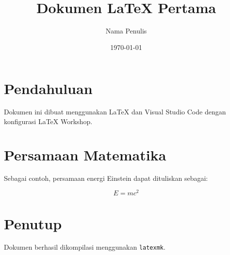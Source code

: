 \documentclass[12pt,a4paper]{article}
\title{Dokumen LaTeX Pertama}
\author{Nama Penulis}
\date{\today}
\begin{document}
\maketitle

\section{Pendahuluan}

Dokumen ini dibuat menggunakan LaTeX
dan Visual Studio Code dengan konfigurasi
LaTeX Workshop.

\section{Persamaan Matematika}

Sebagai contoh, persamaan energi Einstein
dapat dituliskan sebagai:

\begin{equation}
    E = mc^2
\end{equation}

\section{Penutup}

Dokumen berhasil dikompilasi menggunakan
\texttt{latexmk}.
\end{document}
